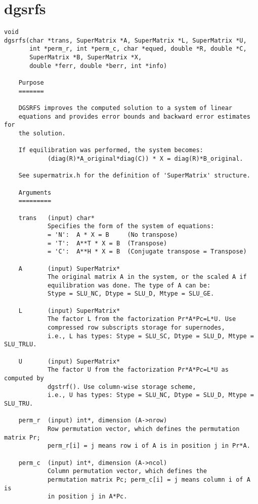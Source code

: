 \section{dgsrfs}
\begin{verbatim}
void
dgsrfs(char *trans, SuperMatrix *A, SuperMatrix *L, SuperMatrix *U,
       int *perm_r, int *perm_c, char *equed, double *R, double *C,
       SuperMatrix *B, SuperMatrix *X, 
       double *ferr, double *berr, int *info)

    Purpose   
    =======   
 
    DGSRFS improves the computed solution to a system of linear   
    equations and provides error bounds and backward error estimates for 
    the solution.   
 
    If equilibration was performed, the system becomes:
            (diag(R)*A_original*diag(C)) * X = diag(R)*B_original.
 
    See supermatrix.h for the definition of 'SuperMatrix' structure.
 
    Arguments   
    =========   
 
    trans   (input) char*
            Specifies the form of the system of equations:   
            = 'N':  A * X = B     (No transpose)   
            = 'T':  A**T * X = B  (Transpose)   
            = 'C':  A**H * X = B  (Conjugate transpose = Transpose)
    
    A       (input) SuperMatrix*
            The original matrix A in the system, or the scaled A if
            equilibration was done. The type of A can be:
            Stype = SLU_NC, Dtype = SLU_D, Mtype = SLU_GE.
     
    L       (input) SuperMatrix*
            The factor L from the factorization Pr*A*Pc=L*U. Use
            compressed row subscripts storage for supernodes, 
            i.e., L has types: Stype = SLU_SC, Dtype = SLU_D, Mtype = SLU_TRLU.
  
    U       (input) SuperMatrix*
            The factor U from the factorization Pr*A*Pc=L*U as computed by
            dgstrf(). Use column-wise storage scheme, 
            i.e., U has types: Stype = SLU_NC, Dtype = SLU_D, Mtype = SLU_TRU.
 
    perm_r  (input) int*, dimension (A->nrow)
            Row permutation vector, which defines the permutation matrix Pr;
            perm_r[i] = j means row i of A is in position j in Pr*A.
 
    perm_c  (input) int*, dimension (A->ncol)
            Column permutation vector, which defines the 
            permutation matrix Pc; perm_c[i] = j means column i of A is 
            in position j in A*Pc.
 

\end{verbatim}

